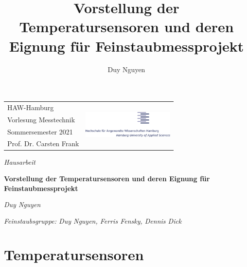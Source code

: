 \documentclass[12pt]{article}
\title{Vorstellung der Temperatursensoren und deren Eignung für Feinstaubmessprojekt}
\author{Duy Nguyen}
\begin{document}
\pagestyle{empty}
\color{smokyblack}

\setlength{\parskip}{1ex}
\begin{table}[t]
  \begin{center}
    \begin{tabular}{p{}r}
      \small{HAW-Hamburg} & \multirow{4}{*}{\includegraphics[width=4.6cm]{haw-logo}} \\
      \small{Vorlesung Messtechnik} &  \\
      \small{Sommersemester 2021} & \\
      \small{Prof. Dr. Carsten Frank} & 
    \end{tabular} 
  \end{center}
\end{table}

\vspace{2cm}

\textsf{\textit{\Large{Hausarbeit}}}

\color{arsenic}
\textsf{\textbf{\huge{Vorstellung der Temperatursensoren und deren Eignung für Feinstaubmessprojekt}}}
\setlength{\parskip}{0.8em}
\color{smokyblack}
\vspace{-2em}

\begin{adjustwidth}{3em}{0pt}
\begin{flushleft}
	\textit{Duy Nguyen} 

  \vspace{-12pt}

  \textit{\footnotesize{Feinstaubsgruppe: Duy Nguyen, Ferris Fensky, Dennis Dick}}
\end{flushleft}
\end{adjustwidth}

\tableofcontents
\newpage
\listoffigures
{}
\listoftables
{}


\newpage
\pagestyle{fancy}
\section{Temperatursensoren}
\label{sec:temperatursensoren}
\end{document}
